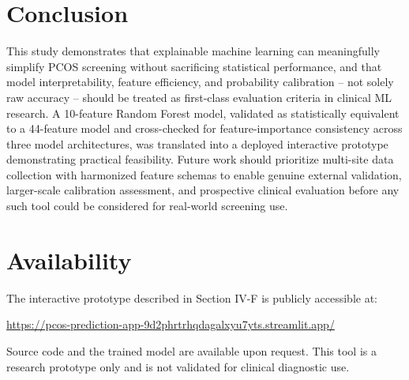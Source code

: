 \documentclass[conference]{IEEEtran}
\begin{document}
\section{Conclusion}

This study demonstrates that explainable machine learning can meaningfully simplify PCOS screening without sacrificing statistical performance, and that model interpretability, feature efficiency, and probability calibration -- not solely raw accuracy -- should be treated as first-class evaluation criteria in clinical ML research. A 10-feature Random Forest model, validated as statistically equivalent to a 44-feature model and cross-checked for feature-importance consistency across three model architectures, was translated into a deployed interactive prototype demonstrating practical feasibility. Future work should prioritize multi-site data collection with harmonized feature schemas to enable genuine external validation, larger-scale calibration assessment, and prospective clinical evaluation before any such tool could be considered for real-world screening use.

\section*{Availability}

The interactive prototype described in Section IV-F is publicly accessible at:
\begin{center}
\footnotesize\url{https://pcos-prediction-app-9d2phrtrhqdagalxyu7yts.streamlit.app/}
\end{center}
Source code and the trained model are available upon request. This tool is a research prototype only and is not validated for clinical diagnostic use.
\end{document}
